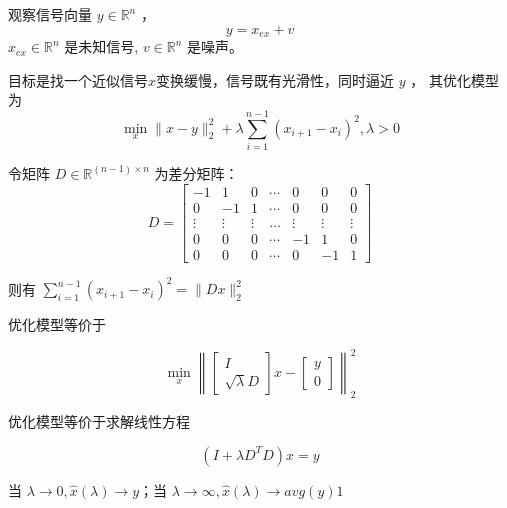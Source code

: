 \begin{problem}[信号去噪问题]
    观察信号向量 $ y \in \mathbb{R}^{n} $ ，
$$
y=x_{e x}+v
$$
$ x_{e x} \in \mathbb{R}^{n} $ 是未知信号, $ v \in \mathbb{R}^{n} $ 是噪声。






    目标是找一个近似信号$x$变换缓慢，信号既有光滑性，同时逼近 $ y $ ， 其优化模型为
$$
\min _{x}\|x-y\|_{2}^{2}+\lambda \sum_{i=1}^{n-1}\left(x_{i+1}-x_{i}\right)^{2}, \lambda>0
$$
\end{problem}


\begin{definition}[差分矩阵]
    令矩阵 $ D \in \mathbb{R}^{(n-1) \times n} $ 为差分矩阵：
$$ D=\left[\begin{array}{ccccccc}-1 & 1 & 0 & \cdots & 0 & 0 & 0 \\ 0 & -1 & 1 & \cdots & 0 & 0 & 0 \\ \vdots & \vdots & \vdots & \ldots & \vdots & \vdots & \vdots \\ 0 & 0 & 0 & \cdots & -1 & 1 & 0 \\ 0 & 0 & 0 & \cdots & 0 & -1 & 1\end{array}\right] $$

\end{definition}


则有 $ \sum_{i=1}^{n-1}\left(x_{i+1}-x_{i}\right)^{2}=\|D x\|_{2}^{2} $

优化模型等价于

$$ \min _{x}\left\|\left[\begin{array}{c}I \\ \sqrt{\lambda} D\end{array}\right] x-\left[\begin{array}{l}y \\ 0\end{array}\right]\right\|_{2}^{2} $$

优化模型等价于求解线性方程

$$
\left(I+\lambda D^{T} D\right) x=y
$$

当 $ \lambda \rightarrow 0, \hat{x}(\lambda) \rightarrow y $；当 $ \lambda \rightarrow \infty, \hat{x}(\lambda) \rightarrow a v g(y) 1 $

